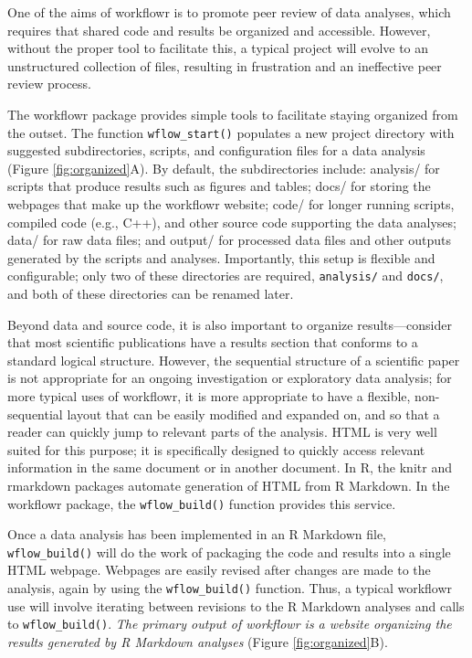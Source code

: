 \documentclass[9pt,a4paper]{extarticle}
\begin{document}
One of the aims of workflowr is to promote peer review of data analyses,
which requires that shared code and results be organized and accessible.
However, without the proper tool to facilitate this, a typical project
will evolve to an unstructured collection of files, resulting in
frustration and an ineffective peer review process.

The workflowr package provides simple tools to facilitate staying
organized from the outset. The function \verb|wflow_start()| populates a new
project directory with suggested subdirectories, scripts, and
configuration files for a data analysis (Figure \ref{fig:organized}A). By default, the
subdirectories include: analysis/ for scripts that produce results such
as figures and tables; docs/ for storing the webpages that make up the
workflowr website; code/ for longer running scripts, compiled code
(e.g., C++), and other source code supporting the data analyses; data/
for raw data files; and output/ for processed data files and other
outputs generated by the scripts and analyses. Importantly, this setup
is flexible and configurable; only two of these directories are
required, \verb|analysis/| and \verb|docs/|, and both of these
directories can be renamed later.

Beyond data and source code, it is also important to organize
results—consider that most scientific publications have a results
section that conforms to a standard logical structure. However, the
sequential structure of a scientific paper is not appropriate for an
ongoing investigation or exploratory data analysis; for more typical
uses of workflowr, it is more appropriate to have a flexible,
non-sequential layout that can be easily modified and expanded on, and
so that a reader can quickly jump to relevant parts of the analysis.
HTML is very well suited for this purpose; it is specifically designed
to quickly access relevant information in the same document or in
another document. In R, the knitr and rmarkdown packages automate
generation of HTML from R Markdown. In the workflowr package, the
\verb|wflow_build()| function provides this service.

Once a data analysis has been implemented in an R Markdown file,
\verb|wflow_build()| will do the work of packaging the code and results into a
single HTML webpage. Webpages are easily revised after changes are made
to the analysis, again by using the \verb|wflow_build()| function. Thus, a
typical workflowr use will involve iterating between revisions to the R
Markdown analyses and calls to \verb|wflow_build()|. \textit{The primary output
of workflowr is a website organizing the results generated by R Markdown
analyses} (Figure \ref{fig:organized}B).
\end{document}
